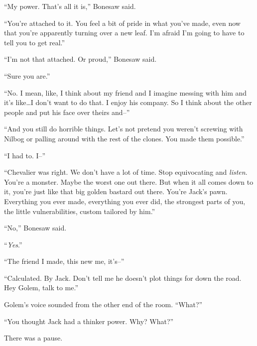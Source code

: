 ``My power.  That's all it is,'' Bonesaw said.



``You're attached to it.  You feel a bit of pride in what you've made, even now that you're apparently turning over a new leaf.  I'm afraid I'm going to have to tell you to get real.''



``I'm not that attached.  Or proud,'' Bonesaw said.



``Sure you are.''



``No.  I mean, like, I think about my friend and I imagine messing with him and it's like\ldots I don't want to do that.  I enjoy his company.  So I think about the other people and put his face over theirs and--''



``And you still do horrible things.  Let's not pretend you weren't screwing with Nilbog or palling around with the rest of the clones.  You made them possible.''



``I had to.  I--''



``Chevalier was right.  We don't have a lot of time.  Stop equivocating and \emph{listen}.  You're a monster.  Maybe the worst one out there.  But when it all comes down to it, you're just like that big golden bastard out there.  You're Jack's pawn.  Everything you ever made, everything you ever did, the strongest parts of you, the little vulnerabilities, custom tailored by him.''



``No,'' Bonesaw said.



``\emph{Yes}.''



``The friend I made, this new me, it's--''



``Calculated.  By Jack.  Don't tell me he doesn't plot things for down the road.  Hey Golem, talk to me.''



Golem's voice sounded from the other end of the room.  ``What?''



``You thought Jack had a thinker power.  Why?  What?''



There was a pause.




